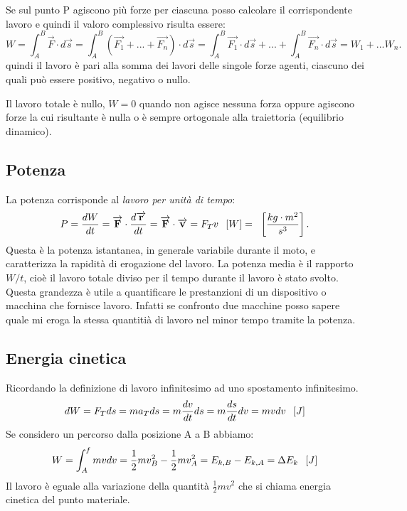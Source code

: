 \documentclass[class=book, crop=false, oneside, 12pt]{standalone}
\begin{document}
Se sul punto P agiscono più forze per ciascuna posso calcolare il corrispondente lavoro e quindi il valoro complessivo risulta essere:
\begin{equation}
    W = \int_A^B \overrightarrow{F} \cdot d \overrightarrow{s} = \int_A^B (\overrightarrow{F_1} + ... + \overrightarrow{F_n}) \cdot d \overrightarrow{s} = \int_A^B \overrightarrow{F_1} \cdot d \overrightarrow{s} + ... + \int_A^B \overrightarrow{F_n} \cdot d \overrightarrow{s} = W_1 + ... W_n.
\end{equation}
quindi il lavoro è pari alla somma dei lavori delle singole forze agenti, ciascuno dei quali può essere positivo, negativo o nullo.

Il lavoro totale è nullo, \(W = 0\) quando non agisce nessuna forza oppure agiscono forze la cui risultante è nulla o è sempre ortogonale alla traiettoria (equilibrio dinamico).

\subsection{Potenza}

La potenza corrisponde al \emph{lavoro per unità di tempo}:
\begin{equation}
    P = \frac{dW}{dt} = \overrightarrow{F} \cdot \frac{d \overrightarrow{r}}{dt} = \overrightarrow{F} \cdot \overrightarrow{v} = F_T v \udm{W} = \udm{\frac{kg \cdot m^2}{s^3}}.
\end{equation}
Questa è la potenza istantanea, in generale variabile durante il moto, e caratterizza la rapidità di erogazione del lavoro. 
La potenza media è il rapporto \(W/t\), cioè il lavoro totale diviso per il tempo durante il lavoro è stato svolto.
Questa grandezza è utile a quantificare le prestanzioni di un dispositivo o macchina che fornisce lavoro. Infatti se confronto due macchine posso sapere quale mi eroga la stessa quantitià di lavoro nel minor tempo tramite la potenza.

\subsection{Energia cinetica}

Ricordando la definizione di lavoro infinitesimo ad uno spostamento infinitesimo.
\begin{equation*}
    d W=F_T d s=m a_T d s=m \frac{d v}{d t} d s=m \frac{d s}{d t} d v=m v d v \hspace{0.2cm} \left[J\right]
\end{equation*}
Se considero un percorso dalla posizione A a B abbiamo:
\begin{equation}
    W=\int_{A}^{f} m v d v=\frac{1}{2} m v_{B}^{2}-\frac{1}{2} m v_{A}^{2}=E_{k, B}-E_{k, A}=\Delta E_{k} \hspace{0.2cm} \left[J\right]
\end{equation}
Il lavoro è eguale alla variazione della quantità \(\frac{1}{2} m v^2\) che si chiama energia cinetica del punto materiale.
\end{document}
